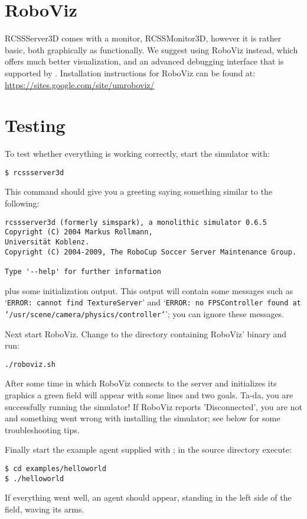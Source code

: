 \section{RoboViz}

RCSSServer3D comes with a monitor, RCSSMonitor3D, however it is rather basic, both graphically as functionally. We suggest using RoboViz instead, which offers much better visualization, and an advanced debugging interface that is supported by \libbats. Installation instructions for RoboViz can be found at:\\
\url{https://sites.google.com/site/umroboviz/}

\section{Testing}

To test whether everything is working correctly, start the simulator with:
\begin{verbatim}
$ rcssserver3d
\end{verbatim}
This command should give you a greeting saying something similar to the following:
\begin{verbatim}
rcssserver3d (formerly simspark), a monolithic simulator 0.6.5
Copyright (C) 2004 Markus Rollmann, 
Universität Koblenz.
Copyright (C) 2004-2009, The RoboCup Soccer Server Maintenance Group.

Type '--help' for further information
\end{verbatim}
plus some initialization output. This output will contain some messages such as `{\tt ERROR: cannot find TextureServer}' and `{\tt ERROR: no FPSController found at}\\{\tt '/usr/scene/camera/physics/controller'}'; you can ignore these messages.

Next start RoboViz. Change to the directory containing RoboViz' binary and run:
\begin{verbatim}
./roboviz.sh
\end{verbatim}
After some time in which RoboViz connects to the server and initializes its graphics a green field will appear with some lines and two goals. Ta-da, you are successfully running the simulator! If RoboViz reports 'Disconnected', you are not and something went wrong with installing the simulator; see below for some troubleshooting tips.

Finally start the example agent supplied with \libbats; in the \libbats source directory execute:
\begin{verbatim}
$ cd examples/helloworld
$ ./helloworld
\end{verbatim}
If everything went well, an agent should appear, standing in the left side of the field, waving its arms.

